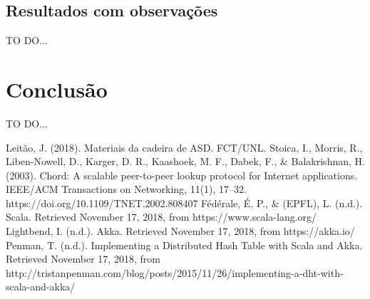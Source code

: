 \documentclass[12pt]{article}
\begin{document}
\subsection{Resultados com observações}

TO DO...

\newpage
\section{Conclusão}

TO DO...

\newpage
\begin{thebibliography}{00}
 Leitão, J. (2018). Materiais da cadeira de ASD. FCT/UNL.
 Stoica, I., Morris, R., Liben-Nowell, D., Karger, D. R., Kaashoek, M. F., Dabek, F., \& Balakrishnan, H. (2003). Chord: A scalable peer-to-peer lookup protocol for Internet applications. IEEE/ACM Transactions on Networking, 11(1), 17–32. https://doi.org/10.1109/TNET.2002.808407
 Fédérale, É. P., \& (EPFL), L. (n.d.). Scala. Retrieved November 17, 2018, from https://www.scala-lang.org/
 Lightbend, I. (n.d.). Akka. Retrieved November 17, 2018, from https://akka.io/
 Penman, T. (n.d.). Implementing a Distributed Hash Table with Scala and Akka. Retrieved November 17, 2018, from http://tristanpenman.com/blog/posts/2015/11/26/implementing-a-dht-with-scala-and-akka/
\end{thebibliography}
\end{document}
